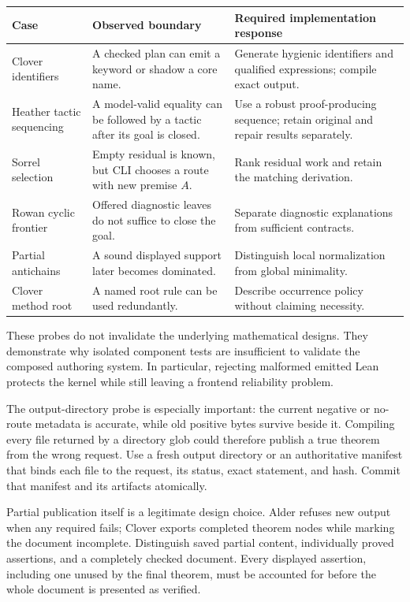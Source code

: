\documentclass[11pt,letterpaper]{article}
\newcommand{\code}[1]{\texttt{\detokenize{#1}}}
\theoremstyle{definition}\newtheorem{definition}[proposition]{Definition}
\theoremstyle{remark}\newtheorem{remark}[proposition]{Remark}
\begin{document}
\begin{center}\small
\begin{tabularx}{\textwidth}{@{}P{0.20\textwidth}P{0.34\textwidth}Y@{}}
\toprule Case & Observed boundary & Required implementation response\\\midrule
Clover identifiers & A checked plan can emit a keyword or shadow a core name. & Generate hygienic identifiers and qualified expressions; compile exact output.\\
Heather tactic sequencing & A model-valid equality can be followed by a tactic after its goal is closed. & Use a robust proof-producing sequence; retain original and repair results separately.\\
Sorrel selection & Empty residual is known, but CLI chooses a route with new premise $A$. & Rank residual work and retain the matching derivation.\\
Rowan cyclic frontier & Offered diagnostic leaves do not suffice to close the goal. & Separate diagnostic explanations from sufficient contracts.\\
Partial antichains & A sound displayed support later becomes dominated. & Distinguish local normalization from global minimality.\\
Clover method root & A named root rule can be used redundantly. & Describe occurrence policy without claiming necessity.\\
\bottomrule
\end{tabularx}
\end{center}
These probes do not invalidate the underlying mathematical designs. They
demonstrate why isolated component tests are insufficient to validate the
composed authoring system. In particular, rejecting malformed emitted Lean
protects the kernel while still leaving a frontend reliability problem.

The output-directory probe is especially important: the current negative or
no-route metadata is accurate, while old positive \code{.lean} bytes survive
beside it. Compiling every file returned by a directory glob could therefore
publish a true theorem from the wrong request. Use a fresh output directory
or an authoritative manifest that binds each file to the request, its status,
exact statement, and hash. Commit that manifest and its artifacts atomically.

Partial publication itself is a legitimate design choice. Alder refuses new
output when any required \code{show} fails; Clover exports completed theorem
nodes while marking the document incomplete. Distinguish saved partial content,
individually proved assertions, and a completely checked document. Every
displayed assertion, including one unused by the final theorem, must be
accounted for before the whole document is presented as verified.
\end{document}

